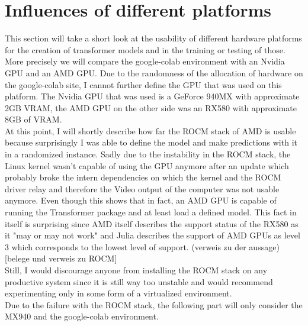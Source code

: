 \section{Influences of different platforms}
This section will take a short look at the usability of different hardware platforms for the creation of transformer models and in the training or testing of those. More precisely we will compare the google-colab environment with an Nvidia GPU and an AMD GPU. Due to the randomness of the allocation of hardware on the google-colab site, I cannot further define the GPU that was used on this platform. The Nvidia GPU that was used is a GeForce 940MX with approximate 2GB VRAM, the AMD GPU on the other side was an RX580 with approximate 8GB of VRAM.\\
At this point, I will shortly describe how far the ROCM stack of AMD is usable because surprisingly I was able to define the model and make predictions with it in a randomized instance. Sadly due to the instability in the ROCM stack, the Linux kernel wasn't capable of using the GPU anymore after an update which probably broke the intern dependencies on which the kernel and the ROCM driver relay and therefore the Video output of the computer was not usable anymore. Even though this shows that in fact, an AMD GPU is capable of running the Transformer package and at least load a defined model. This fact in itself is surprising since AMD itself describes the support status of the RX580 as it "may or may not work" and Julia describes the support of AMD GPUs as level 3 which corresponds to the lowest level of support. (verweis zu der aussage)[belege und verweis zu ROCM]\\
Still, I would discourage anyone from installing the ROCM stack on any productive system since it is still way too unstable and would recommend experimenting only in some form of a virtualized environment. \\
Due to the failure with the ROCM stack, the following part will only consider the MX940 and the google-colab environment.
